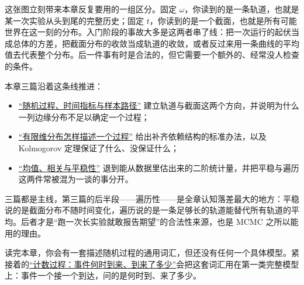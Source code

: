 这张图立刻带来本章反复要用的一组区分。固定 \(\omega\)，你读到的是一条轨道，也就是某一次实验从头到尾的完整历史；固定 \(t\)，你读到的是一个截面，也就是所有可能世界在这一刻的分布。入门阶段的事故大多是这两者串了线：把一次运行的起伏当成总体的方差，把截面分布的收敛当成轨道的收敛，或者反过来用一条曲线的平均值去代表整个分布。后一件事有时是合法的，但它需要一个额外的、经常没人检查的条件。

本章三篇沿着这条线推进：

\begin{itemize}
\tightlist
\item \hyperref[sec:06-Random-Processes/01-Foundations/01]{``随机过程、时间指标与样本路径''} 建立轨道与截面这两个方向，并说明为什么一列边缘分布不足以确定一个过程；
\item \hyperref[sec:06-Random-Processes/01-Foundations/02]{``有限维分布怎样描述一个过程''} 给出补齐依赖结构的标准办法，以及 Kolmogorov 定理保证了什么、没保证什么；
\item \hyperref[sec:06-Random-Processes/01-Foundations/03]{``均值、相关与平稳性''} 退到能从数据里估出来的二阶统计量，并把平稳与遍历这两件常被混为一谈的事分开。
\end{itemize}

三篇都是主线，第三篇的后半段——遍历性——是全章认知落差最大的地方：平稳说的是截面分布不随时间变化，遍历说的是一条足够长的轨道能替代所有轨道的平均。后者才是``跑一次长实验就敢报告期望''的合法性来源，也是 MCMC 之所以能用的理由。

读完本章，你会有一套描述随机过程的通用词汇，但还没有任何一个具体模型。紧接着的\hyperref[ch:047]{``计数过程：事件何时到来、到来了多少''}会把这套词汇用在第一类完整模型上：事件一个接一个到达，问的是何时到、来了多少。
